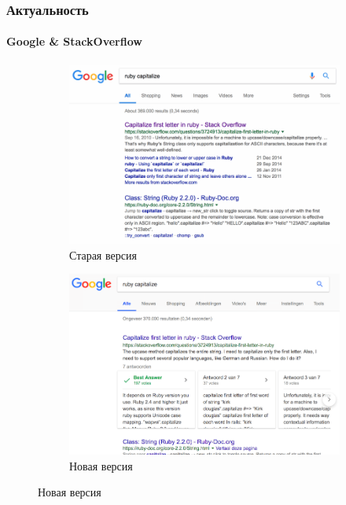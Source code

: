 \documentclass[10pt]{beamer}
\begin{document}

\begin{frame}
\frametitle{Актуальность}
\framesubtitle{Google \& StackOverflow}

\begin{figure}
	\begin{subfigure}[b]{0.49\linewidth}
		\centering
		\includegraphics[width=\linewidth]{images/google_search_old.png}
		\caption{Старая версия}
	\end{subfigure}\hfill
	\begin{subfigure}[b]{0.49\linewidth}
		\centering
		\includegraphics[width=\linewidth]{images/google_search_new.png}
		\caption{Новая версия}
	\end{subfigure}
\end{figure}

\end{frame}
\end{document}
